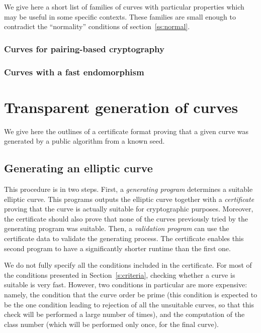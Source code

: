 \documentclass{article}
\begin{document}
We give here a short list of families of curves
with particular properties which may be useful in some specific contexts.
These families are small enough
to contradict the ``normality'' conditions of section~\ref{ss:normal}.

\subsubsection{Curves for pairing-based cryptography}

\subsubsection{Curves with a fast endomorphism}


\section{Transparent generation of curves}
\label{s:certif}

We give here the outlines of a certificate format
proving that a given curve was generated by a public algorithm
from a known seed.

\subsection{Generating an elliptic curve}

This procedure is in two steps.
First, a \emph{generating program} determines a suitable elliptic curve.
This programs outputs the elliptic curve
together with a \emph{certificate} proving that
the curve is actually suitable for cryptographic purposes.
Moreover, the certificate should also prove that
none of the curves previously tried by the generating program
was suitable.
Then, a \emph{validation program} can use the certificate data
to validate the generating process.
The certificate enables this second program
to have a significantly shorter runtime than the first one.

We do not fully specify all the conditions included in the certificate.
For most of the conditions presented in Section~\ref{s:criteria},
checking whether a curve is suitable is very fast.
However, two conditions in particular are more expensive:
namely, the condition that the curve order be prime
(this condition is expected to be the one condition
leading to rejection of all the unsuitable curves,
so that this check will be performed a large number of times),
and the computation of the class number
(which will be performed only once, for the final curve).
\end{document}
